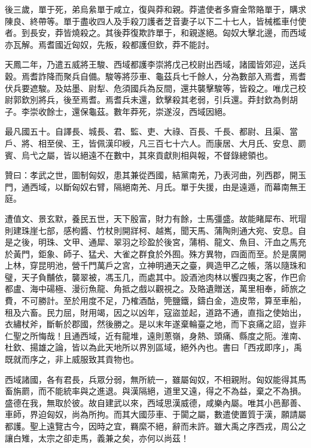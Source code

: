 \begin{pinyinscope}
後三歲，單于死，弟烏絫單于咸立，復與莽和親。莽遣使者多齎金幣賂單于，購求陳良、終帶等。單于盡收四人及手殺刀護者芝音妻子以下二十七人，皆械檻車付使者。到長安，莽皆燒殺之。其後莽復欺詐單于，和親遂絕。匈奴大擊北邊，而西域亦瓦解。焉耆國近匈奴，先叛，殺都護但欽，莽不能討。

天鳳二年，乃遣五威將王駿、西域都護李崇將戊己校尉出西域，諸國皆郊迎，送兵穀。焉耆詐降而聚兵自備。駿等將莎車、龜茲兵七千餘人，分為數部入焉耆，焉耆伏兵要遮駿。及姑墨、尉犁、危須國兵為反間，還共襲擊駿等，皆殺之。唯戊己校尉郭欽別將兵，後至焉耆。焉耆兵未還，欽擊殺其老弱，引兵還。莽封欽為剼胡子。李崇收餘士，還保龜茲。數年莽死，崇遂沒，西域因絕。

最凡國五十。自譯長、城長、君、監、吏、大祿、百長、千長、都尉、且渠、當戶、將、相至侯、王，皆佩漢印綬，凡三百七十六人。而康居、大月氏、安息、罽賓、烏弋之屬，皆以絕遠不在數中，其來貢獻則相與報，不督錄總領也。

贊曰：孝武之世，圖制匈奴，患其兼從西國，結黨南羌，乃表河曲，列西郡，開玉門，通西域，以斷匈奴右臂，隔絕南羌、月氏。單于失援，由是遠遁，而幕南無王庭。

遭值文、景玄默，養民五世，天下殷富，財力有餘，士馬彊盛。故能睹犀布、玳瑁則建珠崖七部，感枸醬、竹杖則開牂柯、越嶲，聞天馬、蒲陶則通大宛、安息。自是之後，明珠、文甲、通犀、翠羽之珍盈於後宮，蒲梢、龍文、魚目、汗血之馬充於黃門，鉅象、師子、猛犬、大雀之群食於外囿。殊方異物，四面而至。於是廣開上林，穿昆明池，營千門萬戶之宮，立神明通天之臺，興造甲乙之帳，落以隨珠和璧，天子負黼依，襲翠被，馮玉几，而處其中。設酒池肉林以饗四夷之客，作巴俞都盧、海中碭極、漫衍魚龍、角抵之戲以觀視之。及賂遺贈送，萬里相奉，師旅之費，不可勝計。至於用度不足，乃榷酒酤，筦鹽鐵，鑄白金，造皮幣，算至車船，租及六畜。民力屈，財用竭，因之以凶年，寇盜並起，道路不通，直指之使始出，衣繡杖斧，斷斬於郡國，然後勝之。是以末年遂棄輪臺之地，而下哀痛之詔，豈非仁聖之所悔哉！且通西域，近有龍堆，遠則蔥嶺，身熱、頭痛、縣度之阨。淮南、杜欽、揚雄之論，皆以為此天地所以界別區域，絕外內也。書曰「西戎即序」，禹既就而序之，非上威服致其貢物也。

西域諸國，各有君長，兵眾分弱，無所統一，雖屬匈奴，不相親附。匈奴能得其馬畜旃罽，而不能統率與之進退。與漢隔絕，道里又遠，得之不為益，棄之不為損。盛德在我，無取於彼。故自建武以來，西域思漢威德，咸樂內屬。唯其小邑鄯善、車師，界迫匈奴，尚為所拘。而其大國莎車、于闐之屬，數遣使置質于漢，願請屬都護。聖上遠覽古今，因時之宜，羇縻不絕，辭而未許。雖大禹之序西戎，周公之讓白雉，太宗之卻走馬，義兼之矣，亦何以尚茲！


\end{pinyinscope}